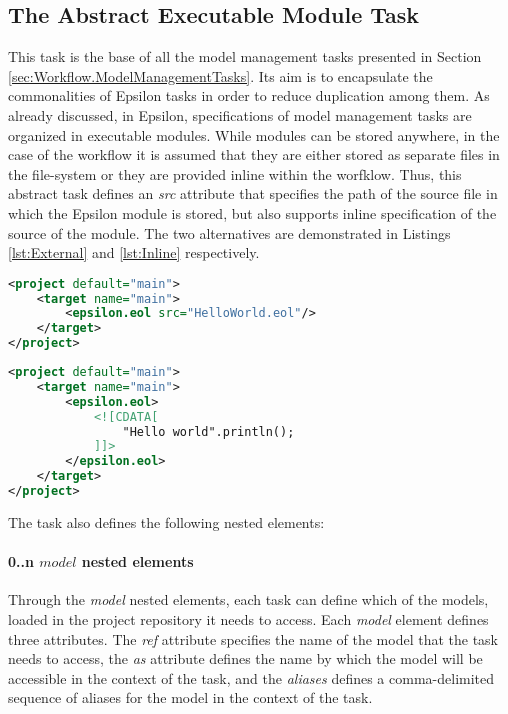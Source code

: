 \subsection{The Abstract Executable Module Task}
\label{sec:ExecutableModuleTask}

This task is the base of all the model management tasks presented in Section \ref{sec:Workflow.ModelManagementTasks}. Its aim is to encapsulate the commonalities of Epsilon tasks in order to reduce duplication among them. As already discussed, in Epsilon, specifications of model management tasks are organized in executable modules. While modules can be stored anywhere, in the case of the workflow it is assumed that they are either stored as separate files in the file-system or they are provided inline within the worfklow. Thus, this abstract task defines an \textit{src} attribute that specifies the path of the source file in which the Epsilon module is stored, but also supports inline specification of the source of the module. The two alternatives are demonstrated in Listings \ref{lst:External} and \ref{lst:Inline} respectively.

\begin{lstlisting}[basicstyle=\ttfamily\footnotesize, flexiblecolumns=true, numbers=none, nolol=true, caption=External Module Specification, label=lst:External, numbers=left, language=XML, tabsize=2]
<project default="main">
	<target name="main">
		<epsilon.eol src="HelloWorld.eol"/>
	</target>
</project>
\end{lstlisting}

\begin{lstlisting}[basicstyle=\ttfamily\footnotesize, flexiblecolumns=true, numbers=none, nolol=true, caption=Inline Module Specification, label=lst:Inline, numbers=left, language=XML, tabsize=2]
<project default="main">
	<target name="main">
		<epsilon.eol>
			<![CDATA[
				"Hello world".println();
			]]>
		</epsilon.eol>
	</target>
</project>
\end{lstlisting}


The task also defines the following nested elements:

\paragraph{0..n $model$ nested elements}

Through the \emph{model} nested elements, each task can define which of the models, loaded in the project repository it needs to access. Each \emph{model} element defines three attributes. The \emph{ref} attribute specifies the name of the model that the task needs to access, the \emph{as} attribute defines the name by which the model will be accessible in the context of the task, and the \emph{aliases} defines a comma-delimited sequence of aliases for the model in the context of the task.

